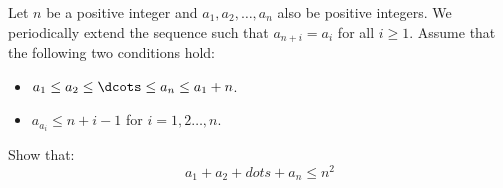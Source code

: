 Let $n$ be a positive integer and $a_1,a_2, \dots,a_n$ also be positive integers.
We periodically extend the sequence such that $a_{n+i} = a_i$ for all $i\geq 1$.
Assume that the following two conditions hold:
\begin{itemize}
    \item $a_1\leq a_2\leq\dcots \leq a_n\leq a_1 +n$.
    \item $a_{a_i} \leq n+i-1$ for $i=1,2\dots,n$.
\end{itemize}
Show that:
$$a_1+a_2+dots +a_n \leq n^2$$
